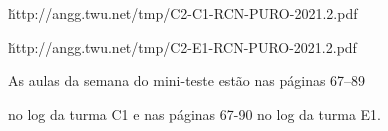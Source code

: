 \documentclass[oneside,12pt]{article}
\begin{document}
\ssk

\u{http://angg.twu.net/tmp/C2-C1-RCN-PURO-2021.2.pdf}

\u{http://angg.twu.net/tmp/C2-E1-RCN-PURO-2021.2.pdf}

\ssk

As aulas da semana do mini-teste estão nas páginas 67--89

no log da turma C1 e nas páginas 67-90 no log da turma E1.








\end{document}
